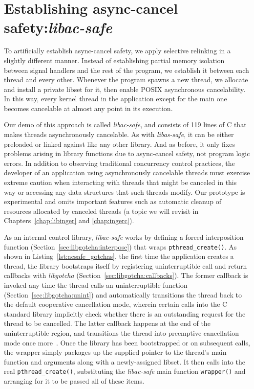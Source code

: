 \section{Establishing async-cancel safety:\@ \textit{libac-safe}}
\label{sec:safety:acsafe}

To artificially establish async-cancel safety, we apply selective relinking in a
slightly different manner.  Instead of establishing partial memory isolation between
signal handlers and the rest of the program, we establish it between each thread and
every other.  Whenever the program spawns a new thread, we allocate and install a
private libset for it, then enable POSIX asynchronous cancelability.  In this way,
every kernel thread in the application except for the main one becomes cancelable at
almost any point in its execution.

Our demo of this approach is called \textit{libac-safe}, and consists of 119 lines of
C that makes threads asynchronously cancelable.  As with \textit{libas-safe}, it can
be either preloaded or linked against like any other library.  And as before, it only
fixes problems arising in library functions due to async-cancel safety, not program
logic errors.  In addition to observing traditional concurrency control practices,
the developer of an application using asynchronously cancelable threads must exercise
extreme caution when interacting with threads that might be canceled in this way or
accessing any data structures that such threads modify.  Our prototype is
experimental and omits important features such as automatic cleanup of resources
allocated by canceled threads (a topic we will revisit in
Chapters~\ref{chap:libinger} and \ref{chap:ingerc}).

As an internal control library, \textit{libac-safe} works by defining a forced
interposition function (Section~\ref{sec:libgotcha:interpose}) that wraps
\texttt{pthread\_create()}.  As shown in Listing~\ref{lst:acsafe_gotchas}, the first
time the application creates a thread, the library bootstraps itself by registering
uninterruptible call and return callbacks with \textit{libgotcha}
(Section~\ref{sec:libgotcha:callbacks}).  The former callback is invoked any time the
thread calls an uninterruptible function (Section~\ref{sec:libgotcha:unint}) and
automatically transitions the thread back to the default cooperative cancellation
mode, wherein certain calls into the C standard library implicitly check whether
there is an outstanding request for the thread to be cancelled.  The latter callback
happens at the end of the uninterruptible region, and transitions the thread into
preemptive cancellation mode once more~\cite{pthreadsetcanceltype-manpage}.  Once the
library has been bootstrapped or on subsequent calls, the wrapper simply packages up
the supplied pointer to the thread's main function and arguments along with a
newly-assigned libset.  It then calls into the real \texttt{pthread\_create()},
substituting the \textit{libac-safe} main function \texttt{wrapper()} and arranging
for it to be passed all of these items.

